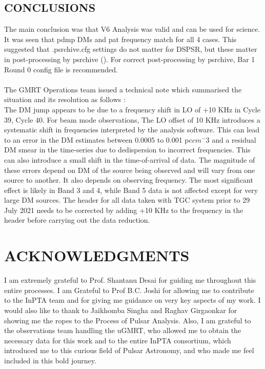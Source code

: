 \documentclass{article}
\begin{document}
\subsection{CONCLUSIONS}
The main conclusion was that \textbf{}{V6 Analysis was valid and can be used for science.}\\
It was seen that pdmp DMs and pat frequency match for all 4 cases. This suggested that .psrchive.cfg settings do not matter for DSPSR, but these matter in post-processing by psrchive (\cite{Hotan+2004}). For correct post-processing by psrchive, Bar 1 Round 0 config file is recommended.\\ \\
The GMRT Operations team issued a technical note which summarised the situation and its resolution as follows :\\
The DM jump appears to be due to a frequency shift in LO of +10 KHz in Cycle 39, Cycle 40.
For beam mode observations, The LO offset of 10 KHz introduces a systematic shift in frequencies interpreted by the analysis software. This can lead to an error in the DM estimates between 0.0005 to 0.001 pc$cm^-3$ and a residual DM smear in the time-series due to dedispersion to incorrect frequencies. This can also introduce a small shift in the time-of-arrival of data. The magnitude of these errors depend on DM of the source being observed and will vary from one source to another. It also depends on observing frequency. The most significant effect is likely in Band 3 and 4, while Band 5 data is not affected except for very large DM sources. The header for all data taken with TGC system prior to 29 July 2021 needs to be corrected by adding +10 KHz to the frequency in the header before carrying out the data reduction.\\
\newpage

\section{ACKNOWLEDGMENTS}
I am extremely grateful to Prof. Shantanu Desai for guiding me throughout this entire processes.  I am Grateful to Prof B.C. Joshi for allowing me to contribute to the InPTA team and for giving me guidance on very key aspects of my work. I would also like to thank to Jaikhomba Singha and Raghav Girgaonkar for showing me the ropes to the Process of Pulsar Analysis. 
Also, I am grateful to the observations team handling the uGMRT, who allowed me to obtain the necessary data for this work and to the entire InPTA consortium, which introduced me to this curious field of Pulsar Astronomy, and who made me feel included in this bold journey.
\newpage

%   
\printbibliography[title={\Large REFERENCES}]
\end{document}

